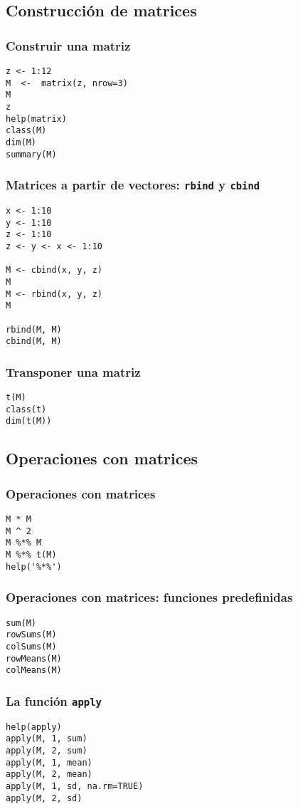\documentclass[bigger]{beamer}
\begin{document}
\subsection{Construcción de matrices}
\label{sec-2-1}
\begin{frame}[fragile]
\frametitle{Construir una matriz}
\label{sec-2-1-1}


\lstset{language=R}
\begin{lstlisting}
z <- 1:12
M  <-  matrix(z, nrow=3)
M
z
help(matrix)
class(M)
dim(M)
summary(M)
\end{lstlisting}
\end{frame}
\begin{frame}[fragile]
\frametitle{Matrices a partir de vectores: \texttt{rbind} y \texttt{cbind}}
\label{sec-2-1-2}


\lstset{language=R}
\begin{lstlisting}
x <- 1:10
y <- 1:10
z <- 1:10
z <- y <- x <- 1:10

M <- cbind(x, y, z)
M
M <- rbind(x, y, z)
M

rbind(M, M)
cbind(M, M)
\end{lstlisting}
\end{frame}
\begin{frame}[fragile]
\frametitle{Transponer una matriz}
\label{sec-2-1-3}



\lstset{language=R}
\begin{lstlisting}
t(M)
class(t)
dim(t(M))
\end{lstlisting}
\end{frame}
\subsection{Operaciones con matrices}
\label{sec-2-2}
\begin{frame}[fragile]
\frametitle{Operaciones con matrices}
\label{sec-2-2-1}



\lstset{language=R}
\begin{lstlisting}
M * M
M ^ 2
M %*% M
M %*% t(M)
help('%*%')
\end{lstlisting}
\end{frame}
\begin{frame}[fragile]
\frametitle{Operaciones con matrices: funciones predefinidas}
\label{sec-2-2-2}



\lstset{language=R}
\begin{lstlisting}
sum(M)
rowSums(M)
colSums(M)
rowMeans(M)
colMeans(M)
\end{lstlisting}
\end{frame}
\begin{frame}[fragile]
\frametitle{La función \texttt{apply}}
\label{sec-2-2-3}


\lstset{language=R}
\begin{lstlisting}
help(apply)
apply(M, 1, sum)
apply(M, 2, sum)
apply(M, 1, mean)
apply(M, 2, mean)
apply(M, 1, sd, na.rm=TRUE)
apply(M, 2, sd)
\end{lstlisting}
\end{frame}
\end{document}
